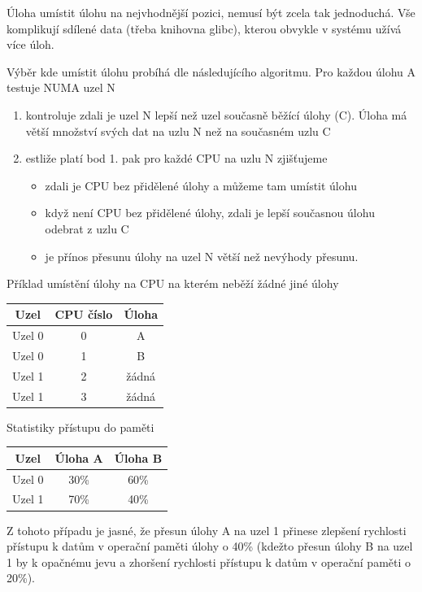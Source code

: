 \documentclass[a4paper,12pt]{article}
\begin{document}
Úloha umístit úlohu na nejvhodnější pozici, nemusí být zcela tak jednoduchá. Vše komplikují sdílené data (třeba knihovna glibc), kterou obvykle v systému užívá více úloh. 

Výběr kde umístit úlohu probíhá dle následujícího algoritmu. 
Pro každou úlohu A testuje NUMA uzel N
\begin{enumerate}
\item kontroluje zdali je uzel N lepší než uzel současně běžící úlohy (C). Úloha má větší množství svých dat na uzlu N než na současném uzlu C
\item estliže platí bod 1. pak pro každé CPU na uzlu N zjišťujeme 
\begin{itemize}
\item zdali je CPU bez přidělené úlohy a můžeme tam umístit úlohu
\item když není CPU bez přidělené úlohy,  zdali je lepší současnou úlohu odebrat z uzlu C
\item je přínos přesunu úlohy na uzel N větší než nevýhody přesunu.
\end{itemize}
\end{enumerate}

Příklad umístění úlohy na CPU na kterém neběží žádné jiné úlohy

\begin{table}
\centering

\begin{tabular}{|c|c|c|}
\hline
Uzel & CPU číslo & Úloha \\
\hline
Uzel 0 & 0 & A \\
\hline
Uzel 0 & 1 & B \\
\hline
Uzel 1 & 2 & žádná \\
\hline
Uzel 1 & 3 & žádná \\
\hline
\end{tabular}
\end{table}

Statistiky přístupu do paměti

\begin{table}
\centering

\begin{tabular}{|c|c|c|}
\hline
Uzel & Úloha A & Úloha B \\
\hline
Uzel 0 & 30\% & 60\% \\
\hline
Uzel 1 & 70\% & 40\% \\
\hline
\end{tabular}
\end{table}

Z tohoto případu je jasné, že přesun úlohy A na uzel 1 přinese zlepšení rychlosti přístupu k datům v operační paměti úlohy o 40\% (kdežto přesun úlohy B na uzel 1 by k opačnému jevu a zhoršení rychlosti přístupu k datům v operační paměti o 20\%).
\end{document}
